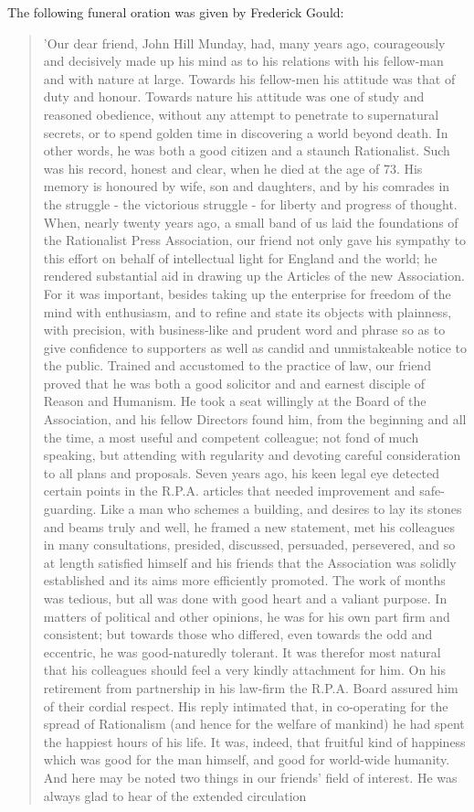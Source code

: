 The following funeral oration was given by Frederick Gould:\cite{JohnHillMundayFuneral}
 
\begin{quotation}
'Our dear friend, John Hill Munday, had, many years ago, courageously and decisively made up his mind as to his relations with his fellow-man and with nature at large. Towards his fellow-men his attitude was that of duty and honour. Towards nature his attitude was one of study and reasoned obedience, without any attempt to penetrate to supernatural secrets, or to spend golden time in discovering a world beyond death. In other words, he was both a good citizen and a staunch Rationalist. Such was his record, honest and clear, when he died at the age of 73. His memory is honoured by wife, son and daughters, and by his comrades in the struggle - the victorious struggle - for liberty and progress of thought. When, nearly twenty years ago, a small band of us laid the foundations of the Rationalist Press Association, our friend not only gave his sympathy to this effort on behalf of intellectual light for England and the world; he rendered substantial aid in drawing up the Articles of the new Association. For it was important, besides taking up the enterprise for freedom of the mind with enthusiasm, and to refine and state its objects with plainness, with precision, with business-like and prudent word and phrase so as to give confidence to supporters as well as candid and unmistakeable notice to the public. Trained and accustomed to the practice of law, our friend proved that he was both a good solicitor and and earnest disciple of Reason and Humanism. He took a seat willingly at the Board of the Association, and his fellow Directors found him, from the beginning and all the time, a most useful and competent colleague; not fond of much speaking, but attending with regularity and devoting careful consideration to all plans and proposals. Seven years ago, his keen legal eye detected certain points in the R.P.A. articles that needed improvement and safe-guarding. Like a man who schemes a building, and desires to lay its stones and beams truly and well, he framed a new statement, met his colleagues in many consultations, presided, discussed, persuaded, persevered, and so at length satisfied himself and his friends that the Association was solidly established and its aims more efficiently promoted. The work of months was tedious, but all was done with good heart and a valiant purpose. In matters of political and other opinions, he was for his own part firm and consistent; but towards those who differed, even towards the odd and eccentric, he was good-naturedly tolerant. It was therefor most natural that his colleagues should feel a very kindly attachment for him. On his retirement from partnership in his law-firm the R.P.A. Board assured him of their cordial respect. His reply intimated that, in co-operating for the spread of Rationalism (and hence for the welfare of mankind) he had spent the happiest hours of his life. It was, indeed, that fruitful kind of happiness which was good for the man himself, and good for world-wide humanity. And here may be noted two things in our friends' field of interest. He was always glad to hear of the extended circulation 
\end{quotation}
